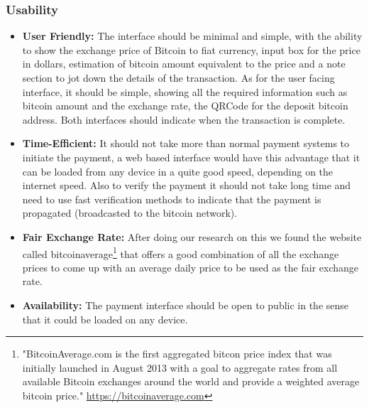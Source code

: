 \subsubsection{Usability} 
\begin{itemize}

\item \textbf{User Friendly: } The interface should be minimal and simple, with the ability to show the exchange price of Bitcoin to fiat currency, input box for the price in dollars, estimation of bitcoin amount equivalent to the price and a note section to jot down the details of the transaction.
As for the user facing interface, it should be simple, showing all the required information such as bitcoin amount and the exchange rate, the QRCode for the deposit bitcoin address. Both interfaces should indicate when the transaction is complete.

\item \textbf{Time-Efficient: } It should not take more than normal payment systems to initiate the payment, a web based interface would have this advantage that it can be loaded from any device in a quite good speed, depending on the internet speed. Also to verify the payment it should not take long time and need to use fast verification methods to indicate that the payment is propagated (broadcasted to the bitcoin network).

\item \textbf{Fair Exchange Rate: } After doing our research on this we found the website called bitcoinaverage\footnote{"BitcoinAverage.com is the first aggregated bitcon price index that was initially launched in August 2013 with a goal to aggregate rates from all available Bitcoin exchanges around the world and provide a weighted average bitcoin price." \url{https://bitcoinaverage.com}} that offers a good combination of all the exchange prices to come up with an average daily price to be used as the fair exchange rate.

\item \textbf{Availability: } The payment interface should be open to public in the sense that it could be loaded on any device. 

\end{itemize}
